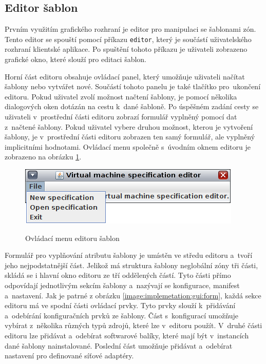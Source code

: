 \subsection{Editor šablon}
\label{chapter:implementation:gui:editor}
Prvním využitím grafického rozhraní je editor pro manipulaci se šablonami zón. Tento editor se spouští pomocí příkazu \verb|editor|,
který je součástí uživatelského rozhraní klientské aplikace. Po spuštění tohoto příkazu je uživateli zobrazeno grafické okno,
které slouží pro editaci šablon.

Horní část editoru obsahuje ovládací panel, který umožňuje uživateli načítat šablony nebo vytvářet nové. Součástí tohoto panelu
je také tlačítko pro~ukončení editoru. Pokud uživatel zvolí možnost načtení šablony, je pomocí několika dialogových oken dotázán
na cestu k~dané šabloně. Po úspěšném zadání cesty se uživateli v~prostřední části editoru zobrazí formulář vyplněný pomocí
dat z~načtené šablony. Pokud uživatel vybere druhou možnost, kterou je vytvoření šablony, je v~prostřední části editoru zobrazen 
ten samý formulář, ale vyplněný implicitními hodnotami. Ovládací menu společně s~úvodním oknem editoru je zobrazeno na 
obrázku \ref{image:implemetation:gui:menu}.
\begin{figure}
    \centering    
    \caption{Ovládací menu editoru šablon}
    \includegraphics[scale=0.9]{assets/pdfs/implemetation_gui_menu.png}
    \label{image:implemetation:gui:menu}
\end{figure}
Formulář pro vyplňování atributu šablony je umístěn ve středu editoru a~tvoří jeho nejpodstatnější část. Jelikož má struktura 
šablony neglobální zóny tři části, skládá se i hlavní okno editoru ze tří oddělených částí. Tyto části přímo odpovídají jednotlivým
sekcím šablony a~nazývají se konfigurace, manifest a~nastavení. Jak je patrné z obrázku \ref{image:implemetation:gui:form}, každá
sekce editoru má ve spodní části ovládací prvky. Tyto prvky slouží k~přidávání a~odebírání konfiguračních prvků ze šablony. Část s~konfigurací
umožňuje vybírat z~několika různých typů zdrojů, které lze v~editoru použít. V~druhé části editoru lze přidávat a~odebírat
softwarové balíky, které mají být v~instancích dané šablony nainstalované. Poslední část umožňuje přidávat a~odebírat nastavení
pro definované síťové adaptéry.

